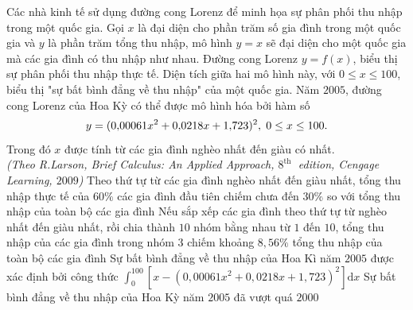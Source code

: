 \begin{ex}%
	Các nhà kinh tế sử dụng đường cong Lorenz để minh họa sự phân phối thu nhập trong một quốc gia. Gọi $x$ là đại diện cho  phần trăm số gia đình trong một quốc gia và $y$ là phần trăm tổng thu nhập, mô hình $y=x$ sẽ đại diện cho một quốc gia mà các gia đình có thu nhập như nhau. Đường cong Lorenz $y=f(x)$, biểu thị sự phân phối thu nhập thực tế. Diện tích giữa hai mô hình này, với $0 \le x \le 100$, biểu thị "sự bất bình đẳng về thu nhập" của một quốc gia. Năm $2005$, đường cong Lorenz của Hoa Kỳ có thể được mô hình hóa bởi hàm số
	$$ y = (0{,}00061x^2+0{,}0218x+1{,}723)^2,\hspace{0.1cm} 0 \le x \le  100.$$
	Trong đó $x$ được tính từ các gia đình nghèo  nhất đến giàu có nhất.\\
	 \textit{(Theo R.Larson, Brief Calculus: An Applied Approach, $8^{\text {th }}$ edition, Cengage Learning, $2009$)}
	\choiceTF 
		{\True Theo thứ tự  từ các gia đình nghèo nhất đến giàu nhất, tổng thu nhập thực tế của $60\%$ các gia đình đầu tiên chiếm chưa đến $30\%$ so với tổng thu nhập của toàn bộ các gia đình}
		{Nếu sắp xếp các gia đình theo thứ tự từ nghèo nhất đến giàu nhất, rồi chia thành $10$ nhóm bằng nhau từ $1$ đến $10$, tổng thu nhập của các gia đình trong nhóm 3 chiếm khoảng $8{,}56\%$ tổng thu nhập của toàn bộ các gia đình} 
		{Sự bất bình đẳng về  thu nhập của Hoa Kì năm $2005$ được xác định bởi công thức
		 $\displaystyle\int_0^{100} \left[x - (0{,}00061x^2+0{,}0218x+1{,}723)^2\right]\mathrm{d}x$}
		{\True Sự bất bình  đẳng về thu nhập của Hoa Kỳ năm $2005$ đã vượt quá $2000$}
\end{ex}
